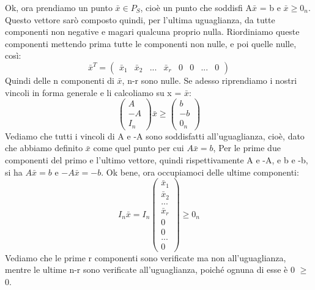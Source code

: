Ok, ora prendiamo un punto $\bar{x} \in P_S$, cioè un punto che soddisfi A$\bar{x}$ = b e $\bar{x} \geq 0_n$. Questo vettore sarò composto quindi, per l'ultima uguaglianza, da tutte componenti non negative e magari qualcuna proprio nulla. Riordiniamo queste componenti mettendo prima tutte le componenti non nulle, e poi quelle nulle, così:
\begin{equation*}
    \bar{x}^T = \begin{pmatrix}
        \bar{x}_1 & \bar{x}_2 & ... & \bar{x}_r & 0 & 0 & ... & 0 
    \end{pmatrix}
\end{equation*}
Quindi delle n componenti di $\bar{x}$, n-r sono nulle. Se adesso riprendiamo i nostri vincoli in forma generale e li calcoliamo su x = $\bar{x}$:
\begin{equation*}
    \begin{pmatrix}
        A\\
        -A\\
        I_n
    \end{pmatrix}\bar{x} \geq \begin{pmatrix}
    b\\
    -b\\
    0_n
\end{pmatrix}
\end{equation*}
Vediamo che tutti i vincoli di A e -A sono soddisfatti all'uguaglianza, cioè, dato che abbiamo definito $\bar{x}$ come quel punto per cui $A\bar{x} = b$, Per le prime due componenti del primo e l'ultimo vettore, quindi rispettivamente A e -A, e b e -b, si ha $A\bar{x} = b$ e $-A\bar{x} = -b$. Ok bene, ora occupiamoci delle ultime componenti:
\begin{equation*}
    I_n\bar{x} = I_n\begin{pmatrix}
        \bar{x}_1\\
        \bar{x}_2\\
        ... \\
        \bar{x}_r\\
        0\\
        0\\
        ...\\ 
        0 
    \end{pmatrix} \geq 0_n 
\end{equation*}
Vediamo che le prime r componenti sono verificate ma non all'uguaglianza, mentre le ultime n-r sono verificate all'uguaglianza, poiché ognuna di esse è 0 $\geq$ 0. 

\vspace{1cm}

